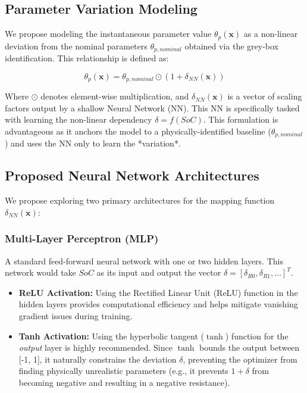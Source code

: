 \documentclass[]{article}
\begin{document}
\subsection{Parameter Variation Modeling}

We propose modeling the instantaneous parameter value $\theta_p(\mathbf{x})$ as a non-linear deviation from the nominal parameters $\theta_{p, nominal}$ obtained via the grey-box identification. This relationship is defined as:

\begin{equation}
	\label{eq:lpv_param}
	\theta_p(\mathbf{x}) = \theta_{p, nominal} \odot (1 + \delta_{NN}(\mathbf{x}))
\end{equation}

Where $\odot$ denotes element-wise multiplication, and $\delta_{NN}(\mathbf{x})$ is a vector of scaling factors output by a shallow Neural Network (NN). This NN is specifically tasked with learning the non-linear dependency $\delta = f(SoC)$. This formulation is advantageous as it anchors the model to a physically-identified baseline ($\theta_{p, nominal}$) and uses the NN only to learn the *variation*.

\subsection{Proposed Neural Network Architectures}

We propose exploring two primary architectures for the mapping function $\delta_{NN}(\mathbf{x})$:

\subsubsection{Multi-Layer Perceptron (MLP)}
A standard feed-forward neural network with one or two hidden layers. This network would take $SoC$ as its input and output the vector $\delta = [\delta_{R0}, \delta_{R1}, \dots]^T$.
\begin{itemize}
	\item \textbf{ReLU Activation:} Using the Rectified Linear Unit (ReLU) function in the hidden layers provides computational efficiency and helps mitigate vanishing gradient issues during training.
	\item \textbf{Tanh Activation:} Using the hyperbolic tangent ($\tanh$) function for the \textit{output} layer is highly recommended. Since $\tanh$ bounds the output between [-1, 1], it naturally constrains the deviation $\delta$, preventing the optimizer from finding physically unrealistic parameters (e.g., it prevents $1+\delta$ from becoming negative and resulting in a negative resistance).
\end{itemize}
\end{document}
